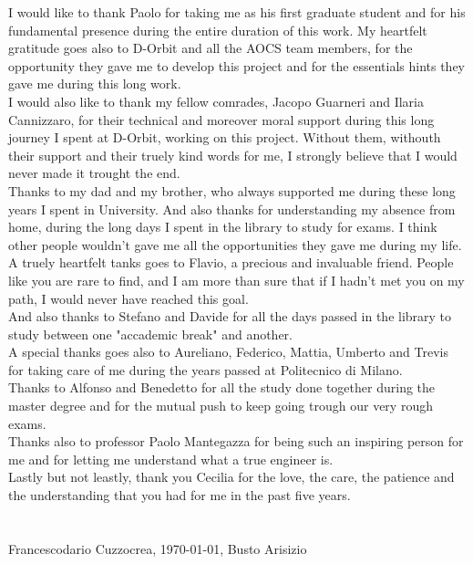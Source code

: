 I would like to thank Paolo for taking me as his first graduate student and for his fundamental presence during the entire duration of this work.
My heartfelt gratitude goes also to D-Orbit and all the AOCS team members, for the opportunity they gave me to develop this project and for the essentials hints they gave me during this long work.\\
I would also like to thank my fellow comrades, Jacopo Guarneri and Ilaria Cannizzaro, for their technical and moreover moral support during this long journey I spent at D-Orbit, working on this project. Without them, withouth their support and their truely kind words for me, I strongly believe that I would never made it trought the end.\\
Thanks to my dad and my brother, who always supported me during these long years I spent in University. And also thanks for understanding my absence from home, during the long days I spent in the library to study for exams. I think other people wouldn't gave me all the opportunities they gave me during my life.\\
A truely heartfelt tanks goes to Flavio, a precious and invaluable friend. People like you are rare to find, and I am more than sure that if I hadn't met you on my path, I would never have reached this goal.\\
And also thanks to Stefano and Davide for all the days passed in the library to study between one "accademic break" and another.\\
A special thanks goes also to Aureliano, Federico, Mattia, Umberto and Trevis for taking care of me during the years passed at Politecnico di Milano.\\
Thanks to Alfonso and Benedetto for all the study done together during the master degree and for the mutual push to keep going trough our very rough exams.\\
Thanks also to professor Paolo Mantegazza for being such an inspiring person for me and for letting me understand what a true engineer is.\\
Lastly but not leastly, thank you Cecilia for the love, the care, the patience and the understanding that you had for me in the past five years.\\
\\
\\
Francescodario Cuzzocrea, \today, Busto Arisizio
